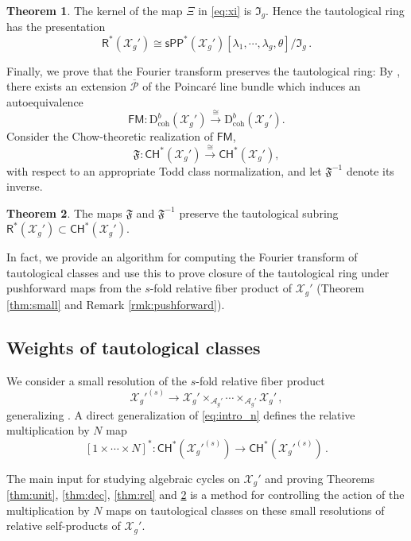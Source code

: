\documentclass[11pt]{article}
\def\CH{\mathsf{CH}}
\def\R{\mathsf{R}}
\def\A{\mathcal{A}}
\def\X{\mathcal{X}}
\def\fm{\mathfrak{F}}
\def\dbcoh{\mathrm{D}^b_{\mathrm{coh}}}
\def\Pbar{\overline{\mathcal{P}}}
\def\FM{\mathsf{FM}}
\newcommand{\sPP}{\mathsf{sPP}}
\newcommand{\spp}{\sPP}
\theoremstyle{definition}
\newtheorem{theoremintro}{Theorem}
\begin{document}
\begin{theoremintro}\label{thm:taut}
    The kernel of the map $\Xi$ in \eqref{eq:xi} is $\mathfrak{I}_g$. Hence the tautological ring has the presentation
    \[
    \R^*(\X_g') \cong \spp^{\ast}(\X_g')[\lambda_1,\cdots, \lambda_g,\theta]/\mathfrak{I}_g\,.
    \]
\end{theoremintro}

Finally, we prove that the Fourier transform preserves the tautological ring:
By \cite[Theorem 1.5]{BMP}, there exists an extension $\Pbar$ of the
Poincar\'e line bundle which induces an autoequivalence
\begin{equation}\label{eq:FM_intro}
    \FM : \dbcoh(\X_g') \xrightarrow{\cong} \dbcoh(\X_g').
\end{equation}
Consider the Chow-theoretic realization of $\FM$,
\begin{equation}\label{eq:F_intro}
    \fm : \CH^*(\X_g') \xrightarrow{\cong} \CH^*(\X_g'),
\end{equation}
with respect to an appropriate Todd class normalization, and let $\fm^{-1}$
denote its inverse.

\begin{theoremintro}\label{thm:FourierIso}
    The maps $\fm$ and $\fm^{-1}$ preserve the tautological subring
    $\R^*(\X_g')\subset \CH^*(\X_g')$.
\end{theoremintro}

In fact, we provide an algorithm for computing the Fourier transform of tautological classes and
use this to prove closure of the tautological ring under pushforward maps from the $s$-fold relative
fiber product of $\X_g'$ (Theorem \ref{thm:small} and Remark \ref{rmk:pushforward}).

\subsection{Weights of tautological classes}

We consider a small resolution of the $s$-fold relative fiber product
\[
\X_g'^{(s)} \to
\X_g' \times_{\A_g'} \cdots \times_{\A_g'} \X_g'\,,
\]
generalizing \cite[Section 3]{BMP}. A direct generalization of \eqref{eq:intro_n} defines
the relative multiplication by $N$ map
\[
[1 \times \cdots \times N]^* : \CH^*(\X_g'^{(s)}) \to \CH^*(\X_g'^{(s)})\,.
\]

The main input for studying algebraic cycles on $\X_g'$ and proving Theorems \ref{thm:unit}, \ref{thm:dec}, \ref{thm:rel} and \ref{thm:FourierIso} is a method for controlling the action of the multiplication by $N$ maps on tautological classes on these small resolutions of relative self-products of $\X_g'$.
\end{document}
